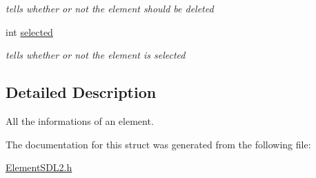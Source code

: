 \begin{DoxyCompactItemize}
\begin{DoxyCompactList}\small\item\em tells whether or not the element should be deleted \end{DoxyCompactList}\item 
int \hyperlink{structElementSDL2_a2cae92fe5dd207db485261128b82bc02}{selected}\hypertarget{structElementSDL2_a2cae92fe5dd207db485261128b82bc02}{}\label{structElementSDL2_a2cae92fe5dd207db485261128b82bc02}

\begin{DoxyCompactList}\small\item\em tells whether or not the element is selected \end{DoxyCompactList}\end{DoxyCompactItemize}


\subsection{Detailed Description}
All the informations of an element. 

The documentation for this struct was generated from the following file\+:\begin{DoxyCompactItemize}
\item 
\hyperlink{ElementSDL2_8h}{Element\+S\+D\+L2.\+h}\end{DoxyCompactItemize}
